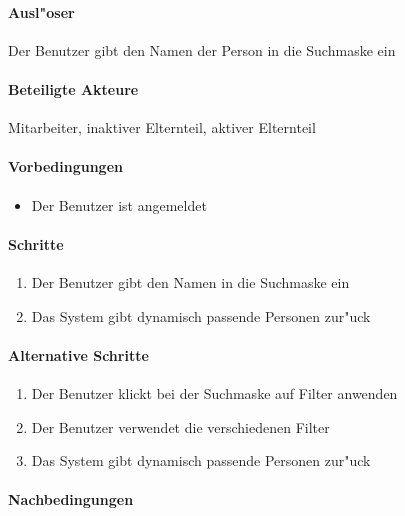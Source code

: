   \paragraph{Ausl"oser}
  Der Benutzer gibt den Namen der Person in die Suchmaske ein
  \paragraph{Beteiligte Akteure}   \leavevmode \newline
    Mitarbeiter, inaktiver Elternteil, aktiver Elternteil
  \paragraph{Vorbedingungen}
  \begin{itemize}
   \item Der Benutzer ist angemeldet
  \end{itemize}

  \paragraph{Schritte}
  \begin{enumerate}
   \item Der Benutzer gibt den Namen in die Suchmaske ein
   \item Das System gibt dynamisch passende Personen zur"uck
  \end{enumerate}

  \paragraph{Alternative Schritte}
  \begin{enumerate}
   \item Der Benutzer klickt bei der Suchmaske auf \dq Filter anwenden\dq
   \item Der Benutzer verwendet die verschiedenen Filter
   \item Das System gibt dynamisch passende Personen zur"uck
  \end{enumerate}

  \paragraph{Nachbedingungen}
